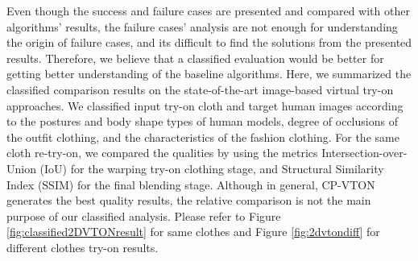Even though the success and failure cases are presented and compared with other algorithms' results, the failure cases' analysis are not enough for understanding the origin of failure cases, and its difficult to find the solutions from the presented results. Therefore, we believe that a classified evaluation would be better for getting better understanding of the baseline algorithms. Here, we summarized the classified comparison results on the state-of-the-art image-based virtual try-on approaches. We classified input try-on cloth and target human images according to the postures and body shape types of human models, degree of occlusions of the outfit clothing, and the characteristics of the fashion clothing. For the same cloth re-try-on, we compared the qualities by using the metrics Intersection-over-Union (IoU) for the warping try-on clothing stage, and Structural Similarity Index (SSIM) for the final blending stage. Although in general, CP-VTON\cite{Wang2018TowardCI} generates the best quality results, the relative comparison is not the main purpose of our classified analysis. Please refer to Figure \ref{fig:classified2DVTONresult} for same clothes and Figure \ref{fig:2dvtondiff} for different clothes try-on results.


